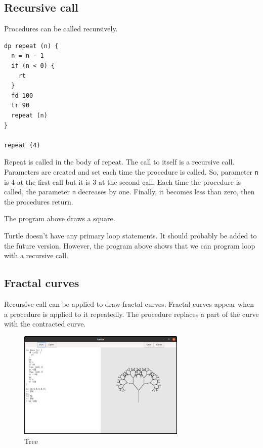 \hypertarget{recursive-call}{%
\subsection{Recursive call}\label{recursive-call}}

Procedures can be called recursively.

\begin{lstlisting}
dp repeat (n) {
  n = n - 1
  if (n < 0) {
    rt
  }
  fd 100
  tr 90
  repeat (n)
}

repeat (4)
\end{lstlisting}

Repeat is called in the body of repeat. The call to itself is a
recursive call. Parameters are created and set each time the procedure
is called. So, parameter \passthrough{\lstinline!n!} is 4 at the first
call but it is 3 at the second call. Each time the procedure is called,
the parameter \passthrough{\lstinline!n!} decreases by one. Finally, it
becomes less than zero, then the procedures return.

The program above draws a square.

Turtle doesn't have any primary loop statements. It should probably be
added to the future version. However, the program above shows that we
can program loop with a recursive call.

\hypertarget{fractal-curves}{%
\subsection{Fractal curves}\label{fractal-curves}}

Recursive call can be applied to draw fractal curves. Fractal curves
appear when a procedure is applied to it repeatedly. The procedure
replaces a part of the curve with the contracted curve.

\begin{figure}
\centering
\includegraphics[width=8cm,height=5.11cm]{../src/turtle/image/turtle_tree.png}
\caption{Tree}
\end{figure}

